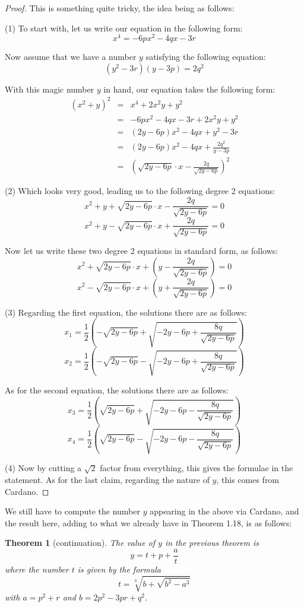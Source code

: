 \documentclass[12pt]{amsbook}
\newtheorem{theorem}{Theorem}[chapter]
\begin{document}
\begin{proof}
This is something quite tricky, the idea being as follows:

\medskip

(1) To start with, let us write our equation in the following form:
$$x^4=-6px^2-4qx-3r$$

Now assume that we have a number $y$ satisfying the following equation:
$$(y^2-3r)(y-3p)=2q^2$$

With this magic number $y$ in hand, our equation takes the following form:
\begin{eqnarray*}
(x^2+y)^2
&=&x^4+2x^2y+y^2\\
&=&-6px^2-4qx-3r+2x^2y+y^2\\
&=&(2y-6p)x^2-4qx+y^2-3r\\
&=&(2y-6p)x^2-4qx+\frac{2q^2}{y-3p}\\
&=&\left(\sqrt{2y-6p}\cdot x-\frac{2q}{\sqrt{2y-6p}}\right)^2
\end{eqnarray*}

(2) Which looks very good, leading us to the following degree 2 equations:
$$x^2+y+\sqrt{2y-6p}\cdot x-\frac{2q}{\sqrt{2y-6p}}=0$$
$$x^2+y-\sqrt{2y-6p}\cdot x+\frac{2q}{\sqrt{2y-6p}}=0$$

Now let us write these two degree 2 equations in standard form, as follows:
$$x^2+\sqrt{2y-6p}\cdot x+\left(y-\frac{2q}{\sqrt{2y-6p}}\right)=0$$
$$x^2-\sqrt{2y-6p}\cdot x+\left(y+\frac{2q}{\sqrt{2y-6p}}\right)=0$$

(3) Regarding the first equation, the solutions there are as follows:
$$x_1=\frac{1}{2}\left(-\sqrt{2y-6p}+\sqrt{-2y-6p+\frac{8q}{\sqrt{2y-6p}}}\right)$$
$$x_2=\frac{1}{2}\left(-\sqrt{2y-6p}-\sqrt{-2y-6p+\frac{8q}{\sqrt{2y-6p}}}\right)$$

As for the second equation, the solutions there are as follows:
$$x_3=\frac{1}{2}\left(\sqrt{2y-6p}+\sqrt{-2y-6p-\frac{8q}{\sqrt{2y-6p}}}\right)$$
$$x_4=\frac{1}{2}\left(\sqrt{2y-6p}-\sqrt{-2y-6p-\frac{8q}{\sqrt{2y-6p}}}\right)$$

(4) Now by cutting a $\sqrt{2}$ factor from everything, this gives the formulae in the statement. As for the last claim, regarding the nature of $y$, this comes from Cardano.
\end{proof}

We still have to compute the number $y$ appearing in the above via Cardano, and the result here, adding to what we already have in Theorem 1.18, is as follows:

\begin{theorem}[continuation]
The value of $y$ in the previous theorem is
$$y=t+p+\frac{a}{t}$$
where the number $t$ is given by the formula
$$t=\sqrt[3]{b+\sqrt{b^2-a^3}}$$
with $a=p^2+r$ and $b=2p^2-3pr+q^2$.
\end{theorem}
\end{document}
